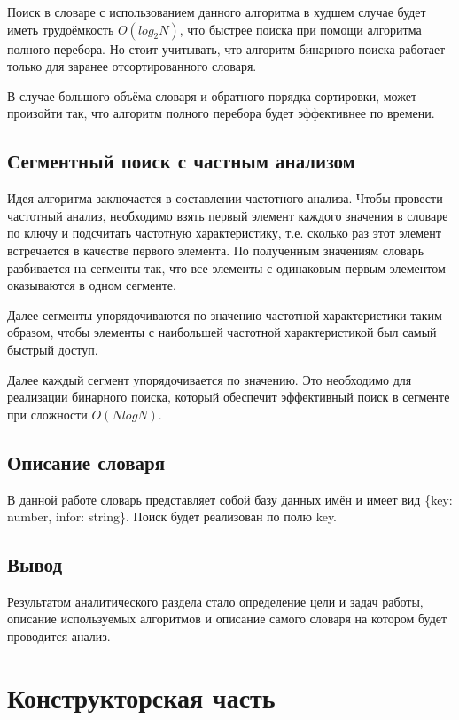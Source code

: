 \documentclass[12pt,a4paper]{report}
\begin{document}
Поиск в словаре с использованием данного алгоритма в худшем случае будет иметь трудоёмкость $O(log_{2}N)$, что быстрее 
поиска при помощи алгоритма полного перебора. 
Но стоит учитывать, что алгоритм бинарного поиска работает только для заранее отсортированного словаря. 

В случае большого объёма словаря и обратного порядка сортировки, может произойти так, что алгоритм полного перебора 
будет эффективнее по времени.  

\section{Сегментный поиск с частным анализом}

Идея алгоритма заключается в составлении частотного анализа. Чтобы провести частотный анализ, необходимо взять
первый элемент каждого значения в словаре по ключу и подсчитать частотную характеристику, т.е. сколько раз этот 
элемент встречается в качестве первого элемента. По полученным значениям словарь разбивается на сегменты так, 
что все элементы с одинаковым первым элементом оказываются в одном сегменте.

Далее сегменты упорядочиваются по значению частотной характеристики таким образом, чтобы элементы с наибольшей 
частотной характеристикой был самый быстрый доступ.

Далее каждый сегмент упорядочивается по значению. Это необходимо для реализации бинарного поиска, который 
обеспечит эффективный поиск в сегменте при сложности $O(N log N)$.

\section{Описание словаря}

В данной работе словарь представляет собой базу данных имён и имеет вид \{key: number, infor: string\}. Поиск 
будет реализован по полю key.

\section{Вывод}

Результатом аналитического раздела стало определение цели и задач работы, описание используемых алгоритмов и 
описание самого словаря на котором будет проводится анализ.

\newpage
\chapter{Конструкторская часть}
\end{document}

